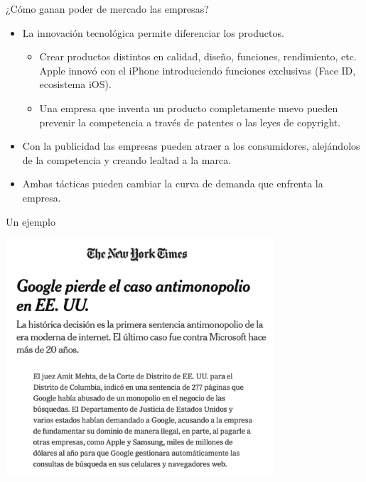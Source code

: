 \documentclass{beamer}
\begin{document}
\begin{frame}{¿Cómo ganan poder de mercado las empresas?}
    \begin{itemize}
        \item La innovación tecnológica permite diferenciar los productos.
        \begin{itemize}
            \item Crear productos distintos en calidad, diseño, funciones, rendimiento, etc. Apple innovó con el iPhone introduciendo funciones exclusivas (Face ID, ecosistema iOS).
            \item Una empresa que inventa un producto completamente nuevo pueden prevenir la competencia a través de patentes o las leyes de copyright.
        \end{itemize}
        \item Con la publicidad las empresas pueden atraer a los consumidores, alejándolos de la competencia y creando lealtad a la marca.
        \item Ambas tácticas pueden cambiar la curva de demanda que enfrenta la empresa. 
    \end{itemize}
\end{frame}
    
\begin{frame}{Un ejemplo}

    \centering
    \includegraphics[width=0.75\textwidth]{../Figures/M15.3.jpg}
    
\end{frame}
\end{document}
